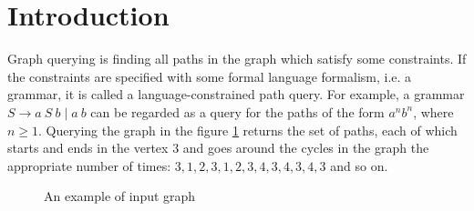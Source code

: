 \section{Introduction}

Graph querying is finding all paths in the graph which satisfy some constraints. 
If the constraints are specified with some formal language formalism, i.e. a grammar, it is called a language-constrained path query. 
For example, a grammar $S \rightarrow a \ S \ b \mid a \ b$ can be regarded as a query for the paths of the form $a^n b^n$, where $n \geq 1$. Querying the graph in the figure \ref{fig:exmplInputGraph} returns the set of paths, each of which starts and ends in the vertex $3$ and goes around the cycles in the graph the appropriate number of times: $3,1,2,3,1,2,3,4,3,4,3,4,3$ and so on. 




\begin{figure}[h]
\caption{An example of input graph}
\label{fig:exmplInputGraph}
\end{figure}

